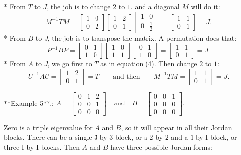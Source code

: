 * From \(T\) to \(J\), the job is to change \(2\) to \(1\). and a diagonal \(M\) will do it: \[M^{-1}TM=\begin{bmatrix}1&0\\ 0&2\end{bmatrix}\begin{bmatrix}1&2\\ 0&1\end{bmatrix}\begin{bmatrix}1&0\\ 0&\frac{1}{2}\end{bmatrix}=\begin{bmatrix}1&1\\ 0&1\end{bmatrix}=J.\]
* From \(B\) to \(J\), the job is to transpose the matrix. A permutation does that: \[P^{-1}BP=\begin{bmatrix}0&1\\ 1&0\end{bmatrix}\begin{bmatrix}1&0\\ 1&1\end{bmatrix}\begin{bmatrix}0&1\\ 1&0\end{bmatrix}=\begin{bmatrix}1&1\\ 0&1\end{bmatrix}=J.\]
* From \(A\) to \(J\), we go first to \(T\) as in equation (4). Then change \(2\) to \(1\): \[U^{-1}AU=\begin{bmatrix}1&2\\ 0&1\end{bmatrix}=T\qquad\text{and then}\qquad M^{-1}TM=\begin{bmatrix}1&1\\ 0&1\end{bmatrix}=J.\]

**Example 5**.: \(A=\begin{bmatrix}0&1&2\\ 0&0&1\\ 0&0&0\end{bmatrix}\quad\text{and}\quad B=\begin{bmatrix}0&0&1\\ 0&0&0\\ 0&0&0\end{bmatrix}.\)

Zero is a triple eigenvalue for \(A\) and \(B\), so it will appear in all their Jordan blocks. There can be a single \(3\) by \(3\) block, or a \(2\) by \(2\) and a \(1\) by I block, or three I by I blocks. Then \(A\) and \(B\) have three possible Jordan forms:

